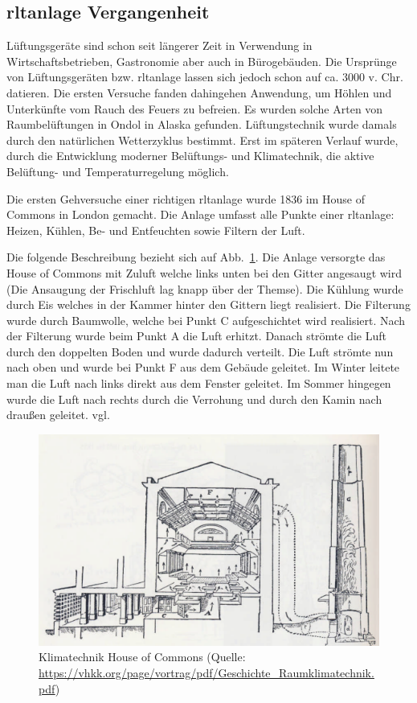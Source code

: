 \subsection{\ac{rltanlage} Vergangenheit}
Lüftungsgeräte sind schon seit längerer Zeit in Verwendung \zB in Wirtschaftsbetrieben, Gastronomie aber auch in Bürogebäuden. Die Ursprünge von Lüftungsgeräten bzw. \ac{rltanlage} lassen sich jedoch schon auf ca. 3000 v. Chr. datieren.
Die ersten Versuche fanden dahingehen Anwendung, um Höhlen und Unterkünfte vom Rauch des Feuers zu befreien. Es wurden solche Arten von Raumbelüftungen \zB in Ondol in Alaska gefunden.
Lüftungstechnik wurde damals durch den natürlichen Wetterzyklus bestimmt. 
Erst im späteren Verlauf wurde, durch die Entwicklung moderner Belüftungs- und Klimatechnik, die aktive Belüftung- und Temperaturregelung möglich.

Die ersten Gehversuche einer richtigen \acs{rltanlage} wurde 1836 im House of Commons in London gemacht. Die Anlage umfasst alle Punkte einer \acs{rltanlage}: Heizen, Kühlen, Be- und Entfeuchten sowie Filtern der Luft. 

Die folgende Beschreibung bezieht sich auf
Abb.~\ref{fig:House_of_Commons_Klimatechnik}.
Die Anlage versorgte das House of Commons mit Zuluft welche links unten bei den Gitter angesaugt wird (Die Ansaugung der Frischluft lag knapp über der Themse). Die Kühlung wurde durch Eis welches in der Kammer hinter den Gittern liegt realisiert.
Die Filterung wurde durch Baumwolle, welche bei Punkt C aufgeschichtet wird realisiert.
Nach der Filterung wurde beim Punkt A die Luft erhitzt. 
Danach strömte die Luft durch den doppelten Boden und wurde dadurch verteilt. Die Luft strömte nun nach oben und wurde bei Punkt F aus dem Gebäude geleitet. Im Winter leitete man die Luft nach links direkt aus dem Fenster geleitet. Im Sommer hingegen wurde die Luft nach rechts durch die Verrohung und durch den Kamin  nach draußen geleitet. vgl.
\cite[vgl.][]{Fitzner_Finke:2010} 

\begin{figure}[ht]
	\centering
	\includegraphics[width=0.6\linewidth]{Bilder/Belueftung_House_of_Commons}
	\caption{Klimatechnik House of Commons  (Quelle: \url{https://vhkk.org/page/vortrag/pdf/Geschichte_Raumklimatechnik.pdf})}
	\label{fig:House_of_Commons_Klimatechnik}
\end{figure}



